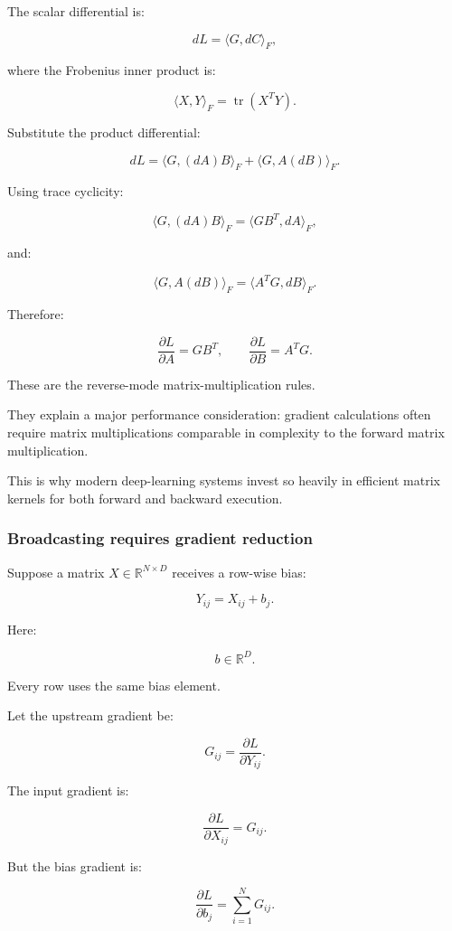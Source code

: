 The scalar differential is:

\[
dL=\langle G,dC\rangle_F,
\]

where the Frobenius inner product is:

\[
\langle X,Y\rangle_F =\operatorname{tr}(X^TY).
\]

Substitute the product differential:

\[
dL=\langle G,(dA)B\rangle_F+ \langle G,A(dB)\rangle_F.
\]

Using trace cyclicity:

\[
\langle G,(dA)B\rangle_F =\langle GB^T,dA\rangle_F,
\]

and:

\[
\langle G,A(dB)\rangle_F =\langle A^TG,dB\rangle_F.
\]

Therefore:

\[
\boxed{ \frac{\partial L}{\partial A}=GB^T, \qquad \frac{\partial L}{\partial B}=A^TG }.
\]

These are the reverse-mode matrix-multiplication rules.

They explain a major performance consideration: gradient calculations often require matrix multiplications comparable in complexity to the forward matrix multiplication.

This is why modern deep-learning systems invest so heavily in efficient matrix kernels for both forward and backward execution.

\subsubsection{Broadcasting requires gradient reduction}\label{02-foundations-ii-ch022-broadcasting-requires-gradient-reduction}

Suppose a matrix \(X\in\mathbb R^{N\times D}\) receives a row-wise bias:

\[
Y_{ij}=X_{ij}+b_j.
\]

Here:

\[
b\in\mathbb R^D.
\]

Every row uses the same bias element.

Let the upstream gradient be:

\[
G_{ij}=\frac{\partial L}{\partial Y_{ij}}.
\]

The input gradient is:

\[
\frac{\partial L}{\partial X_{ij}}=G_{ij}.
\]

But the bias gradient is:

\[
\boxed{ \frac{\partial L}{\partial b_j} = \sum_{i=1}^{N}G_{ij} }.
\]


